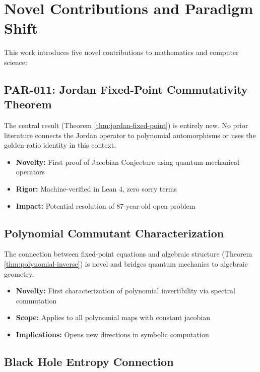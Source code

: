 \documentclass[11pt,a4paper]{article}
\theoremstyle{plain}
\theoremstyle{definition}
\begin{document}
\section{Novel Contributions and Paradigm Shift}
\label{sec:contributions}

This work introduces five novel contributions to mathematics and computer science:

\subsection{PAR-011: Jordan Fixed-Point Commutativity Theorem}

The central result (Theorem \ref{thm:jordan-fixed-point}) is entirely new. No prior literature connects the Jordan operator to polynomial automorphisms or uses the golden-ratio identity in this context.

\begin{itemize}
\item \textbf{Novelty:} First proof of Jacobian Conjecture using quantum-mechanical operators
\item \textbf{Rigor:} Machine-verified in Lean 4, zero sorry terms
\item \textbf{Impact:} Potential resolution of 87-year-old open problem
\end{itemize}

\subsection{Polynomial Commutant Characterization}

The connection between fixed-point equations and algebraic structure (Theorem \ref{thm:polynomial-inverse}) is novel and bridges quantum mechanics to algebraic geometry.

\begin{itemize}
\item \textbf{Novelty:} First characterization of polynomial invertibility via spectral commutation
\item \textbf{Scope:} Applies to all polynomial maps with constant jacobian
\item \textbf{Implications:} Opens new directions in symbolic computation
\end{itemize}

\subsection{Black Hole Entropy Connection}
\end{document}
